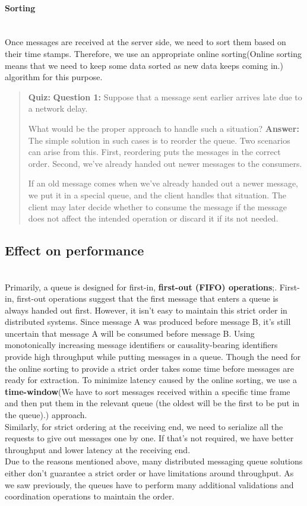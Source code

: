 \paragraph{Sorting}\label{vSNEXYECZ2Tw5t4JFFB2K}
\\
Once messages are received at the server side, we need to sort them based on their time stamps. Therefore, we use an appropriate online sorting(Online sorting means that we need to keep some data sorted as new data keeps coming in.) algorithm for this purpose.

\begin{quote}
\textbf{Quiz:}
\textbf{Question 1:} Suppose that a message sent earlier arrives late due to a network delay.

What would be the proper approach to handle such a situation?
\textbf{Answer:} The simple solution in such cases is to reorder the queue. Two scenarios can arise from this. First, reordering puts the messages in the correct order. Second, we've already handed out newer messages to the consumers.

If an old message comes when we've already handed out a newer message, we put it in a special queue, and the client handles that situation. The client may later decide whether to consume the message if the message does not affect the intended operation or discard it if it\textquotesingle s not needed.
\end{quote}

\subsection{Effect on performance}\label{y2V-TK0AkiwMnQUAS6RM8}
\\
Primarily, a queue is designed for first-in, \textbf{first-out (FIFO) operations};. First-in, first-out operations suggest that the first message that enters a queue is always handed out first. However, it isn't easy to maintain this strict order in distributed systems. Since message A was produced before message B, it's still uncertain that message A will be consumed before message B. Using monotonically increasing message identifiers or causality-bearing identifiers provide high throughput while putting messages in a queue. Though the need for the online sorting to provide a strict order takes some time before messages are ready for extraction. To minimize latency caused by the online sorting, we use a \textbf{time-window}(We have to sort messages received within a specific time frame and then put them in the relevant queue (the oldest will be the first to be put in the queue).) approach.
\\
Similarly, for strict ordering at the receiving end, we need to serialize all the requests to give out messages one by one. If that's not required, we have better throughput and lower latency at the receiving end.
\\
Due to the reasons mentioned above, many distributed messaging queue solutions either don't guarantee a strict order or have limitations around throughput. As we saw previously, the queues have to perform many additional validations and coordination operations to maintain the order.

